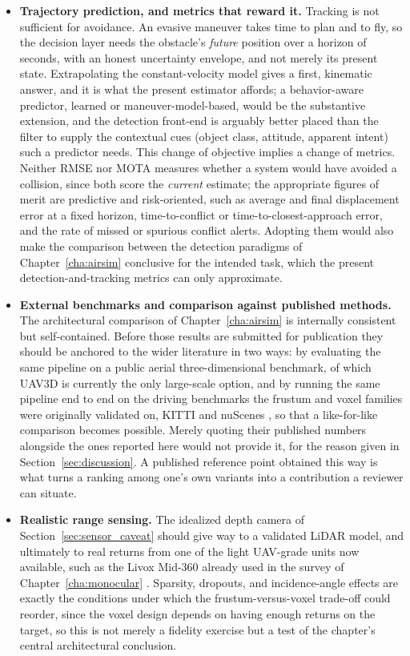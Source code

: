 \begin{itemize}
  \item \textbf{Trajectory prediction, and metrics that reward it.} Tracking is
  not sufficient for avoidance. An evasive maneuver takes time to plan and to fly,
  so the decision layer needs the obstacle's \emph{future} position over a horizon
  of seconds, with an honest uncertainty envelope, and not merely its present
  state. Extrapolating the constant-velocity model gives a first, kinematic
  answer, and it is what the present estimator affords; a behavior-aware predictor,
  learned or maneuver-model-based, would be the substantive extension, and the
  detection front-end is arguably better placed than the filter to supply the
  contextual cues (object class, attitude, apparent intent) such a predictor needs.
  This change of objective implies a change of metrics. Neither RMSE nor MOTA
  measures whether a system would have avoided a collision, since both score the
  \emph{current} estimate; the appropriate figures of merit are predictive and
  risk-oriented, such as average and final displacement error at a fixed horizon,
  time-to-conflict or time-to-closest-approach error, and the rate of missed or
  spurious conflict alerts. Adopting them would also make the comparison between
  the detection paradigms of Chapter~\ref{cha:airsim} conclusive for the intended
  task, which the present detection-and-tracking metrics can only approximate.

  \item \textbf{External benchmarks and comparison against published methods.} The
  architectural comparison of Chapter~\ref{cha:airsim} is internally consistent but
  self-contained. Before those results are submitted for publication they should be
  anchored to the wider literature in two ways: by evaluating the same pipeline on
  a public aerial three-dimensional benchmark, of which UAV3D
  \cite{ye2024uav3d} is currently the only large-scale option, and by running the
  same pipeline end to end on the driving benchmarks the frustum and voxel families
  were originally validated on, KITTI \cite{geiger2012kitti} and nuScenes
  \cite{caesar2020nuscenes}, so that a like-for-like comparison becomes possible.
  Merely quoting their published numbers alongside the ones reported here would not
  provide it, for the reason given in Section~\ref{sec:discussion}. A published
  reference point obtained this way is what turns a ranking among one's own
  variants into a contribution a reviewer can situate.

  \item \textbf{Realistic range sensing.} The idealized depth camera of
  Section~\ref{sec:sensor_caveat} should give way to a validated LiDAR model, and
  ultimately to real returns from one of the light UAV-grade units now available,
  such as the Livox Mid-360 already used in the survey of
  Chapter~\ref{cha:monocular} \cite{livox_mid360}. Sparsity, dropouts, and
  incidence-angle effects are exactly the conditions under which the
  frustum-versus-voxel trade-off could reorder, since the voxel design depends on
  having enough returns on the target, so this is not merely a fidelity exercise
  but a test of the chapter's central architectural conclusion.


\end{itemize}
